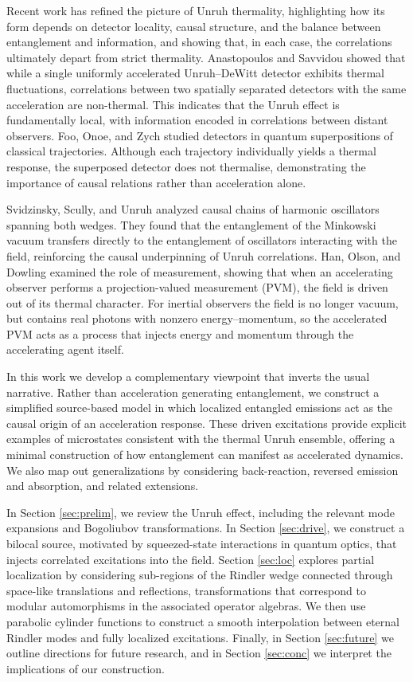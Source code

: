\documentclass[12pt,a4paper]{article}
\begin{document}
Recent work has refined the picture of Unruh thermality, highlighting how its form depends on detector locality, causal structure, and the balance between entanglement and information, and showing that, in each case, the correlations ultimately depart from strict thermality. Anastopoulos and Savvidou \cite{anastopoulos2012coherences} showed that while a single uniformly accelerated Unruh–DeWitt detector exhibits thermal fluctuations, correlations between two spatially separated detectors with the same acceleration are non-thermal. This indicates that the Unruh effect is fundamentally local, with information encoded in correlations between distant observers. Foo, Onoe, and Zych \cite{foo2020unruh} studied detectors in quantum superpositions of classical trajectories. Although each trajectory individually yields a thermal response, the superposed detector does not thermalise, demonstrating the importance of causal relations rather than acceleration alone.

Svidzinsky, Scully, and Unruh \cite{Svidzinsky2024MinkowskiVEA} analyzed causal chains of harmonic oscillators spanning both wedges. They found that the entanglement of the Minkowski vacuum transfers directly to the entanglement of oscillators interacting with the field, reinforcing the causal underpinning of Unruh correlations. Han, Olson, and Dowling \cite{han2008generating} examined the role of measurement, showing that when an accelerating observer performs a projection-valued measurement (PVM), the field is driven out of its thermal character. For inertial observers the field is no longer vacuum, but contains real photons with nonzero energy–momentum, so the accelerated PVM acts as a process that injects energy and momentum through the accelerating agent itself.

In this work we develop a complementary viewpoint that inverts the usual narrative. Rather than acceleration generating entanglement, we construct a simplified source-based model in which localized entangled emissions act as the causal origin of an acceleration response. These driven excitations provide explicit examples of microstates consistent with the thermal Unruh ensemble, offering a minimal construction of how entanglement can manifest as accelerated dynamics. We also map out generalizations by considering back-reaction, reversed emission and absorption, and related extensions.

In Section \ref{sec:prelim}, we review the Unruh effect, including the relevant mode expansions and Bogoliubov transformations. In Section \ref{sec:drive}, we construct a bilocal source, motivated by squeezed-state interactions in quantum optics, that injects correlated excitations into the field. Section \ref{sec:loc} explores partial localization by considering sub-regions of the Rindler wedge connected through space-like translations and reflections, transformations that correspond to modular automorphisms in the associated operator algebras. We then use parabolic cylinder functions to construct a smooth interpolation between eternal Rindler modes and fully localized excitations. Finally, in Section \ref{sec:future} we outline directions for future research, and in Section \ref{sec:conc} we interpret the implications of our construction.
\end{document}
